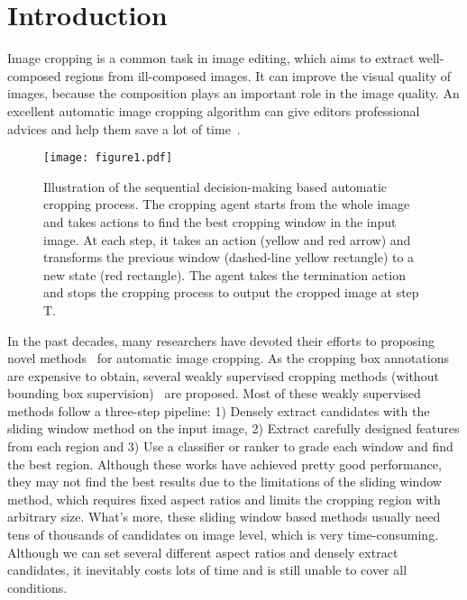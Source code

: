 \documentclass[10pt,twocolumn,letterpaper]{article}
\begin{document}
\section{Introduction}

Image cropping is a common task in image editing, which aims to extract well-composed regions from ill-composed images. It can improve the visual quality of images, because the composition plays an important role in the image quality. An excellent automatic image cropping algorithm can give editors professional advices and help them save a lot of time~\cite{kao2017automatic}.
\begin{figure}
\begin{center}
\texttt{[image: figure1.pdf]}
\caption{Illustration of the sequential decision-making based automatic cropping process. The cropping agent starts from the whole image and takes actions to find the best cropping window in the input image. At each step, it takes an action (yellow and red arrow) and transforms the previous window (dashed-line yellow rectangle) to a new state (red rectangle). The agent takes the termination action and stops the cropping process to output the cropped image at step T.}
\end{center}
\label{fig:1}
\end{figure}

In the past decades, many researchers have devoted their efforts to proposing novel methods~\cite{yan2013learning,esmaeili2016fast,hongcnn} for automatic image cropping. As the cropping box annotations are expensive to obtain, several weakly supervised cropping methods (without bounding box supervision)~\cite{fang2014automatic,chen-acmmm-2017,zhang2014weakly} are proposed. Most of these weakly supervised methods follow a three-step pipeline: 1) Densely extract candidates with the sliding window method on the input image, 2) Extract carefully designed features from each region and 3) Use a classifier or ranker to grade each window and find the best region. Although these works have achieved pretty good performance, they may not find the best results due to the limitations of the sliding window method, which requires fixed aspect ratios and limits the cropping region with arbitrary size. What's more, these sliding window based methods usually need tens of thousands of candidates on image level, which is very time-consuming. Although we can set several different aspect ratios and densely extract candidates, it inevitably costs lots of time and is still unable to cover all conditions.
\end{document}
